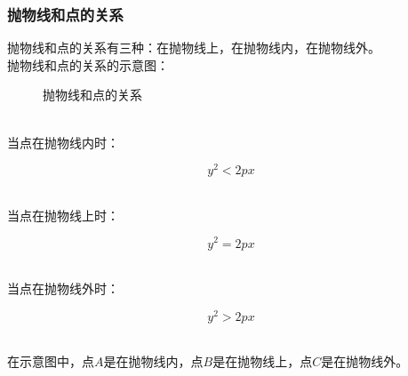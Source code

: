 \documentclass[UTF8]{ctexart}
\begin{document}
\newpage

\subsubsection{抛物线和点的关系}
    抛物线和点的关系有三种：在抛物线上，在抛物线内，在抛物线外。\\[3mm]
    抛物线和点的关系的示意图：
    \begin{figure}[h!]
        \begin{center}
            \caption{抛物线和点的关系}
        \end{center}
    \end{figure}\\
    当点在抛物线内时：
    \begin{large}
        \begin{equation*}
            y^2<2px
        \end{equation*}
    \end{large}\\
    当点在抛物线上时：
    \begin{large}
        \begin{equation*}
            y^2=2px
        \end{equation*}
    \end{large}\\
    当点在抛物线外时：
    \begin{large}
        \begin{equation*}
            y^2>2px
        \end{equation*}
    \end{large}\\
    在示意图中，点$A$是在抛物线内，点$B$是在抛物线上，点$C$是在抛物线外。

\newpage
\end{document}

